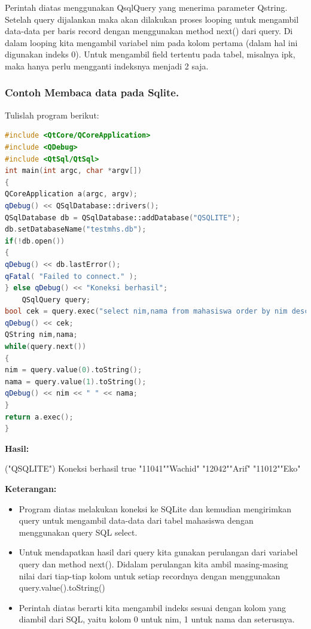 Perintah diatas menggunakan QsqlQuery yang menerima parameter Qstring.
Setelah query dijalankan maka akan dilakukan proses looping untuk
mengambil data-data per baris record dengan menggunakan method next()
dari query. Di dalam looping kita mengambil variabel nim pada kolom
pertama (dalam hal ini digunakan indeks 0). Untuk mengambil field
tertentu pada tabel, misalnya ipk, maka hanya perlu mengganti indeksnya
menjadi 2 saja.

\subsubsection*{Contoh  Membaca data pada Sqlite.}

Tulislah program berikut:

\begin{lstlisting}[language=c++, caption= Membaca data pada Sqlite]
#include <QtCore/QCoreApplication>
#include <QDebug>
#include <QtSql/QtSql>
int main(int argc, char *argv[])
{
QCoreApplication a(argc, argv);
qDebug() << QSqlDatabase::drivers();
QSqlDatabase db = QSqlDatabase::addDatabase("QSQLITE");
db.setDatabaseName("testmhs.db");
if(!db.open())
{
qDebug() << db.lastError();
qFatal( "Failed to connect." );
} else qDebug() << "Koneksi berhasil";
    QSqlQuery query;
bool cek = query.exec("select nim,nama from mahasiswa order by nim desc");
qDebug() << cek;
QString nim,nama;
while(query.next())
{
nim = query.value(0).toString();
nama = query.value(1).toString();
qDebug() << nim << " " << nama;
}
return a.exec();
}
\end{lstlisting}

\textbf{Hasil:}

\begin{lcverbatim}
("QSQLITE")
Koneksi berhasil
true
"11041""Wachid"
"12042""Arif"
"11012""Eko"
\end{lcverbatim}

\textbf{Keterangan:}

\begin{itemize}

\item
  Program diatas melakukan koneksi ke SQLite dan kemudian mengirimkan
  query untuk mengambil data-data dari tabel mahasiswa dengan
  menggunakan query SQL select.
\item
  Untuk mendapatkan hasil dari query kita gunakan perulangan dari
  variabel query dan method next(). Didalam perulangan kita ambil
  masing-masing nilai dari tiap-tiap kolom untuk setiap recordnya dengan
  menggunakan query.value().toString()
\item
  Perintah diatas berarti kita mengambil indeks sesuai dengan kolom yang
  diambil dari SQL, yaitu kolom 0 untuk nim, 1 untuk nama dan
  seterusnya.
\end{itemize}


